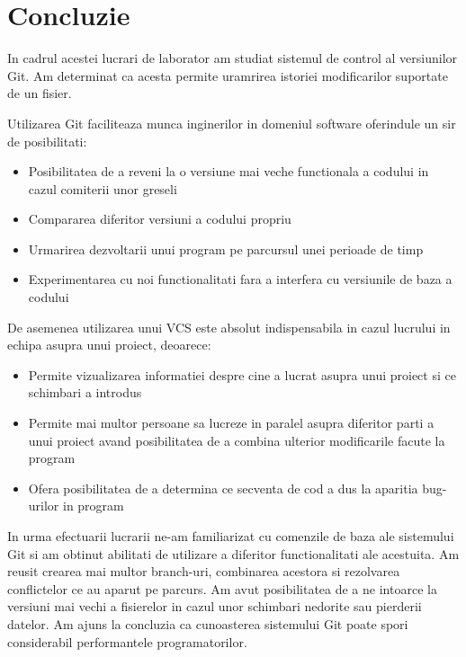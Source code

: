 \section*{Concluzie}


In cadrul acestei lucrari de laborator am studiat sistemul de control al versiunilor Git. Am determinat ca acesta permite uramrirea istoriei modificarilor suportate de un fisier.

Utilizarea Git faciliteaza munca inginerilor in domeniul software oferindule un sir de posibilitati:
\begin{itemize}

\item Posibilitatea de a reveni la o versiune mai veche functionala a codului in cazul comiterii unor greseli
\item Compararea diferitor versiuni a codului propriu
\item Urmarirea dezvoltarii unui program pe parcursul unei perioade de timp 
\item Experimentarea cu noi functionalitati fara a interfera cu versiunile de baza a codului

\end{itemize}

De asemenea utilizarea unui VCS este absolut indispensabila in cazul lucrului in echipa asupra unui proiect, deoarece:

\begin{itemize}
\item Permite vizualizarea informatiei despre cine a lucrat asupra unui proiect si ce schimbari a introdus
\item Permite mai multor persoane sa lucreze in paralel asupra diferitor parti a unui proiect avand posibilitatea de a combina ulterior modificarile facute la program
\item Ofera posibilitatea de a determina ce secventa de cod a dus la aparitia bug-urilor in program
\end{itemize}
In urma efectuarii lucrarii ne-am familiarizat cu comenzile de baza ale sistemului Git si am obtinut abilitati de utilizare a diferitor functionalitati ale acestuita. Am reusit crearea mai multor branch-uri, combinarea acestora si rezolvarea conflictelor ce au aparut pe parcurs. Am avut posibilitatea de a ne intoarce la versiuni mai vechi a fisierelor in cazul unor schimbari nedorite sau pierderii datelor. 
Am ajuns la concluzia ca cunoasterea sistemului Git poate spori considerabil performantele programatorilor.


\clearpage